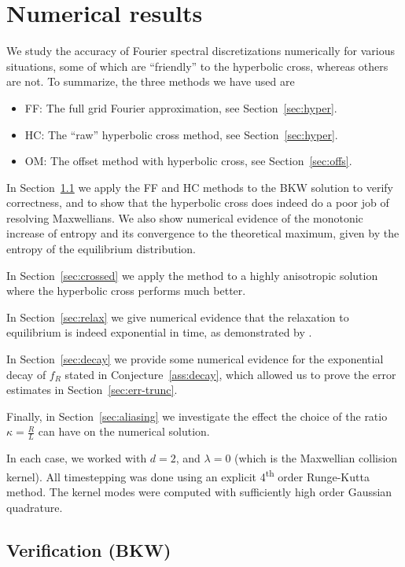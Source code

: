 \section{Numerical results} \label{sec:numerical-fou}

We study the accuracy of Fourier spectral discretizations numerically for various
situations, some of which are ``friendly'' to the hyperbolic cross, whereas others
are not. To summarize, the three methods we have used are
\begin{itemize}
    \item FF: The full grid Fourier approximation, see Section~\ref{sec:hyper}.
    \item HC: The ``raw'' hyperbolic cross method, see Section~\ref{sec:hyper}.
    \item OM: The offset method with hyperbolic cross, see Section~\ref{sec:offs}.
\end{itemize}

In Section~\ref{sec:verify} we apply the FF and HC methods to the BKW solution
to verify correctness, and to show that the hyperbolic cross does indeed do a
poor job of resolving Maxwellians. We also show numerical evidence of the
monotonic increase of entropy and its convergence to the theoretical maximum,
given by the entropy of the equilibrium distribution.

In Section~\ref{sec:crossed} we apply the method to a highly anisotropic
solution where the hyperbolic cross performs much better.

In Section~\ref{sec:relax} we give numerical evidence that the
relaxation to equilibrium is indeed exponential in time, as demonstrated by
\cite{Gressman11}.

In Section~\ref{sec:decay} we provide some numerical evidence for the exponential
decay of $f_R$ stated in Conjecture~\ref{ass:decay}, which allowed us to prove the
error estimates in Section~\ref{sec:err-trunc}.

Finally, in Section~\ref{sec:aliasing} we investigate the effect the choice of
the ratio $\kappa=\frac{R}{L}$ can have on the numerical solution.

In each case, we worked with $d=2$, and $\lambda=0$ (which is the Maxwellian
collision kernel). All timestepping was done using an explicit
4\textsuperscript{th} order Runge-Kutta method. The kernel modes were computed
with sufficiently high order Gaussian quadrature.

\subsection{Verification (BKW)} \label{sec:verify}

